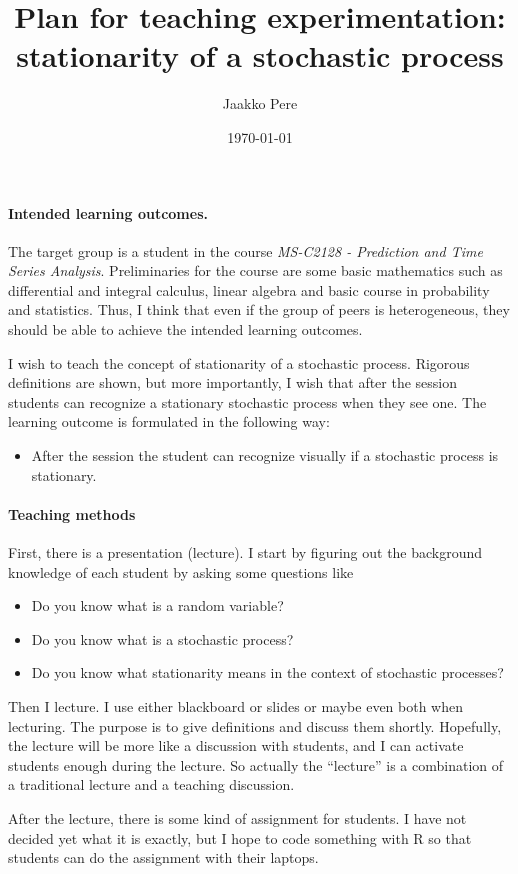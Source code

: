 \documentclass[a4paper,12pt]{article}
\title{Plan for teaching experimentation: stationarity of a stochastic process}
\author{Jaakko Pere}
\date{\today}
\begin{document}
\maketitle

\paragraph{Intended learning outcomes.} The target group is a student in the
course \emph{MS-C2128 - Prediction and Time Series Analysis}. Preliminaries for
the course are some basic mathematics such as differential and integral
calculus, linear algebra and basic course in probability and statistics. Thus, I
think that even if the group of peers is heterogeneous, they should be able to
achieve the intended learning outcomes.

I wish to teach the concept of stationarity of a stochastic process. Rigorous
definitions are shown, but more importantly, I wish that after the session
students can recognize a stationary stochastic process when they see one. The
learning outcome is formulated in the following way:
\begin{itemize}
    \item After the session the student can recognize visually if a stochastic
    process is stationary.
\end{itemize}

\paragraph{Teaching methods} First, there is a presentation (lecture). I start by
figuring out the background knowledge of each student by asking some questions
like
\begin{itemize}
    \item Do you know what is a random variable?
    \item Do you know what is a stochastic process?
    \item Do you know what stationarity means in the context of stochastic
    processes?
\end{itemize}
Then I lecture. I use either blackboard or slides or maybe even both when
lecturing. The purpose is to give definitions and discuss them shortly.
Hopefully, the lecture will be more like a discussion with students, and I can
activate students enough during the lecture. So actually the ``lecture'' is a
combination of a traditional lecture and a teaching discussion.

After the lecture, there is some kind of assignment for students. I have not
decided yet what it is exactly, but I hope to code something with \textsf{R} so
that students can do the assignment with their laptops.
\end{document}
